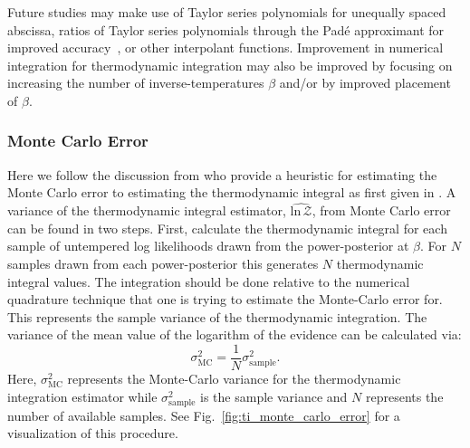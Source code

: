 Future studies may make use of Taylor series polynomials for unequally spaced abscissa, ratios of Taylor series polynomials through the Pad$\textrm{\'e}$ approximant for improved accuracy~\citep{press1992pade}, or other interpolant functions. Improvement in numerical integration for thermodynamic integration may also be improved by focusing on increasing the number of inverse-temperatures $\beta$ and/or by improved placement of $\beta$.

\subsubsection{Monte Carlo Error}
Here we follow the discussion from \cite{annis2019thermodynamic} who provide a heuristic for estimating the Monte Carlo error to estimating the thermodynamic integral as first given in \cite{friel2008marginal}. A variance of the thermodynamic integral estimator, $\widehat{\mathrm{ln} \, \mathcal{Z}}$, from Monte Carlo error can be found in two steps. First, calculate the thermodynamic integral for each sample of untempered log likelihoods drawn from the power-posterior at $\beta$. For $N$ samples drawn from each power-posterior this generates $N$ thermodynamic integral values. The integration should be done relative to the numerical quadrature technique that one is trying to estimate the Monte-Carlo error for. This represents the sample variance of the thermodynamic integration. The variance of the mean value of the logarithm of the evidence can be calculated via:
\begin{equation}
    \sigma^2_{\mathrm{MC}} = \frac{1}{N} \sigma^2_{\mathrm{sample}}.
\end{equation}
Here, $\sigma^2_{\mathrm{MC}}$ represents the Monte-Carlo variance for the thermodynamic integration estimator while $\sigma^2_{\mathrm{sample}}$ is the sample variance and $N$ represents the number of available samples. See Fig.~\ref{fig:ti_monte_carlo_error} for a visualization of this procedure.

